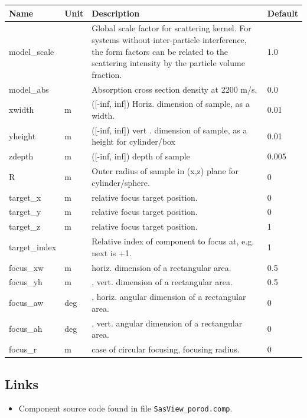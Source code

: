 \begin{longtable}{p{}p{}p{}p{}}
\toprule
\textbf{Name} & \textbf{Unit} & \textbf{Description} & \textbf{Default} \\
\midrule
\endhead
model\_scale &   & Global scale factor for scattering kernel. For systems without inter-particle interference, the form factors can be related to the scattering intensity by the particle volume fraction. & 1.0 \\
model\_abs &   & Absorption cross section density at 2200 m/s. & 0.0 \\
xwidth & m & ([-inf, inf]) Horiz. dimension of sample, as a width. & 0.01 \\
yheight & m & ([-inf, inf]) vert . dimension of sample, as a height for cylinder/box & 0.01 \\
zdepth & m & ([-inf, inf]) depth of sample & 0.005 \\
R & m & Outer radius of sample in (x,z) plane for cylinder/sphere. & 0 \\
target\_x & m & relative focus target position. & 0 \\
target\_y & m & relative focus target position. & 0 \\
target\_z & m & relative focus target position. & 1 \\
target\_index &   & Relative index of component to focus at, e.g. next is +1. & 1 \\
focus\_xw & m & horiz. dimension of a rectangular area. & 0.5 \\
focus\_yh & m & , vert. dimension of a rectangular area. & 0.5 \\
focus\_aw & deg & , horiz. angular dimension of a rectangular area. & 0 \\
focus\_ah & deg & , vert. angular dimension of a rectangular area. & 0 \\
focus\_r & m & case of circular focusing, focusing radius. & 0 \\
\bottomrule
\end{longtable}

\subsection*{Links}
\begin{itemize}
  \item Component source code found in file \texttt{SasView\_porod.comp}.
\end{itemize}
